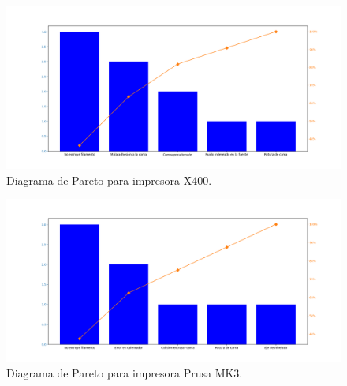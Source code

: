 \begin{figure}[H]
\centering
\includegraphics[scale=0.35]{images/paretox400.png}
\caption{Diagrama de Pareto para impresora X400.}
\label{paretox400}
\end{figure}

\begin{figure}[H]
\centering
\includegraphics[scale=0.35]{images/paretomk3.png}
\caption{Diagrama de Pareto para impresora Prusa MK3.}
\label{paretomk3}
\end{figure}

